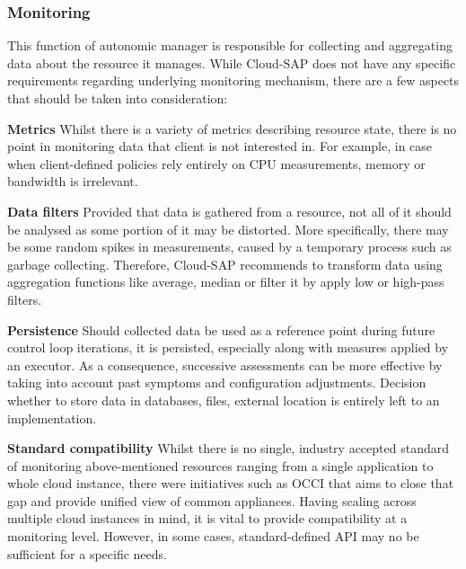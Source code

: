 \subsubsection{Monitoring}
This function of autonomic manager is responsible for collecting and aggregating data about the resource it manages.  While Cloud-SAP does not have any specific requirements regarding underlying monitoring mechanism, there are a few aspects that should be taken into consideration:
\begin{asparaenum}
  \item[\textbf{Metrics}] Whilst there is a variety of metrics describing resource state, there is no point in monitoring data that client is not interested in. For example, in case when client-defined policies rely entirely on CPU measurements, memory or bandwidth is irrelevant.

  \item[\textbf{Data filters}] Provided that data is gathered from a resource, not all of it should be analysed as some portion of it may be distorted. More specifically, there may be some random spikes in measurements, caused by a temporary process such as garbage collecting. Therefore, Cloud-SAP recommends to transform data using aggregation functions like average, median or filter it by apply low or high-pass filters.

  \item[\textbf{Persistence}] Should collected data be used as a reference point during future control loop iterations, it is persisted, especially along with measures applied by an executor. As a consequence, successive assessments can be more effective by taking into account past symptoms and configuration adjustments. Decision whether to store data in databases, files, external location is entirely left to an implementation.

  \item[\textbf{Standard compatibility}] Whilst there is no single, industry accepted standard of monitoring above-mentioned resources ranging from a single application to whole cloud instance, there were initiatives such as OCCI \cite{OCCI} that aims to close that gap and provide unified view of common appliances. Having scaling across multiple cloud instances in mind, it is vital to provide compatibility at a monitoring level. However, in some cases, standard-defined API may no be sufficient for a specific needs. 
\end{asparaenum}

